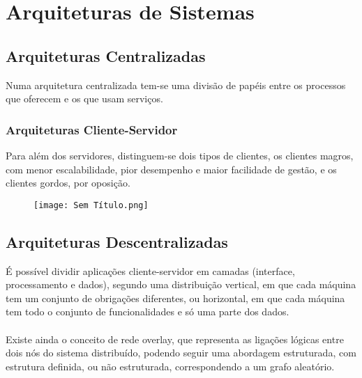 \documentclass[10pt,a4paper]{report}
\begin{document}
\section{Arquiteturas de Sistemas}
\subsection{Arquiteturas Centralizadas}
Numa arquitetura centralizada tem-se uma divisão de papéis entre os processos que oferecem e os que usam serviços.
\subsubsection{Arquiteturas Cliente-Servidor}
Para além dos servidores, distinguem-se dois tipos de clientes, os clientes magros, com menor escalabilidade, pior desempenho e maior facilidade de gestão, e os clientes gordos, por oposição.
\begin{figure}[H]
\centering
\texttt{[image: Sem Título.png]}
\end{figure}
\subsection{Arquiteturas Descentralizadas}
É possível dividir aplicações cliente-servidor em camadas (interface, processamento e dados), segundo uma distribuição vertical, em que cada máquina tem um conjunto de obrigações diferentes, ou horizontal, em que cada máquina tem todo o conjunto de funcionalidades e só uma parte dos dados.\\
\\
Existe ainda o conceito de rede overlay, que representa as ligações lógicas entre dois nós do sistema distribuído, podendo seguir uma abordagem estruturada, com estrutura definida, ou não estruturada, correspondendo a um grafo aleatório.
\end{document}
